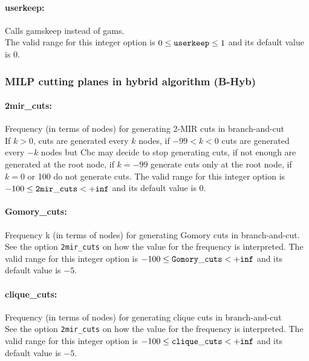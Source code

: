 \paragraph{userkeep:}\label{sec:userkeep} Calls gamskeep instead of gams. $\;$ \\
 The valid range for this integer option is
$0 \le {\tt userkeep } \le 1$
and its default value is $0$.


\subsubsection{MILP cutting planes in hybrid algorithm (B-Hyb)}
\label{sec:MILP_cutting_planes_in_hybrid_algorithm_(B-Hyb)}

\paragraph{2mir\_cuts:}\label{sec:2mir_cuts} Frequency (in terms of nodes) for generating 2-MIR cuts in branch-and-cut $\;$ \\
 If $k > 0$, cuts are generated every $k$ nodes, if
$-99 < k < 0$ cuts are generated every $-k$ nodes but
Cbc may decide to stop generating cuts, if not
enough are generated at the root node, if $k=-99$
generate cuts only at the root node, if $k=0$ or
100 do not generate cuts. 
The valid range for this integer option is
$-100 \le {\tt 2mir\_cuts } <  {\tt +inf}$
and its default value is $0$.


\paragraph{Gomory\_cuts:}\label{sec:Gomory_cuts} Frequency k (in terms of nodes) for generating Gomory cuts in branch-and-cut. $\;$ \\
See the option \texttt{2mir\_cuts} on how the value for the frequency is interpreted.
The valid range for this integer option is
$-100 \le {\tt Gomory\_cuts } <  {\tt +inf}$
and its default value is $-5$.


\paragraph{clique\_cuts:}\label{sec:clique_cuts} Frequency (in terms of nodes) for generating clique cuts in branch-and-cut $\;$ \\
See the option \texttt{2mir\_cuts} on how the value for the frequency is interpreted.
The valid range for this integer option is
$-100 \le {\tt clique\_cuts } <  {\tt +inf}$
and its default value is $-5$.


